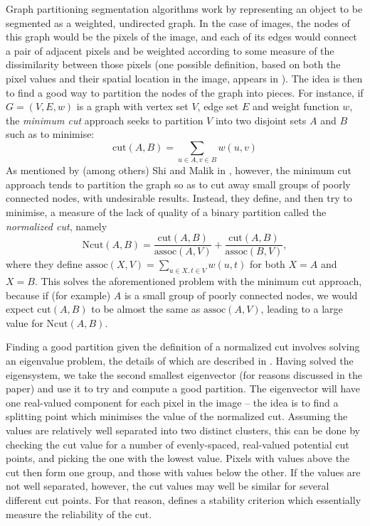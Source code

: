 Graph partitioning segmentation algorithms work by representing an object to be segmented as a weighted, undirected graph. In the case of images, the nodes of this graph would be the pixels of the image, and each of its edges would connect a pair of adjacent pixels and be weighted according to some measure of the dissimilarity between those pixels (one possible definition, based on both the pixel values and their spatial location in the image, appears in \cite{shi00}). The idea is then to find a good way to partition the nodes of the graph into pieces. For instance, if $G = (V,E,w)$ is a graph with vertex set $V$, edge set $E$ and weight function $w$, the \emph{minimum cut} approach seeks to partition $V$ into two disjoint sets $A$ and $B$ such as to minimise:
%
\[
\mbox{cut}(A,B) = \sum_{u \in A, v \in B} w(u,v)
\]
%
As mentioned by (among others) Shi and Malik in \cite{shi00}, however, the minimum cut approach tends to partition the graph so as to cut away small groups of poorly connected nodes, with undesirable results. Instead, they define, and then try to minimise, a measure of the lack of quality of a binary partition called the \emph{normalized cut}, namely
%
\[
\mbox{Ncut}(A,B) = \frac{\mbox{cut}(A,B)}{\mbox{assoc}(A,V)} + \frac{\mbox{cut}(A,B)}{\mbox{assoc}(B,V)},
\]
%
where they define $\mbox{assoc}(X,V) = \sum_{u \in X, t \in V} w(u,t)$ for both $X = A$ and $X = B$. This solves the aforementioned problem with the minimum cut approach, because if (for example) $A$ is a small group of poorly connected nodes, we would expect $\mbox{cut}(A,B)$ to be almost the same as $\mbox{assoc}(A,V)$, leading to a large value for $\mbox{Ncut}(A,B)$.

Finding a good partition given the definition of a normalized cut involves solving an eigenvalue problem, the details of which are described in \cite{shi00}. Having solved the eigensystem, we take the second smallest eigenvector (for reasons discussed in the paper) and use it to try and compute a good partition. The eigenvector will have one real-valued component for each pixel in the image -- the idea is to find a splitting point which minimises the value of the normalized cut. Assuming the values are relatively well separated into two distinct clusters, this can be done by checking the cut value for a number of evenly-spaced, real-valued potential cut points, and picking the one with the lowest value. Pixels with values above the cut then form one group, and those with values below the other. If the values are not well separated, however, the cut values may well be similar for several different cut points. For that reason, \cite{shi00} defines a stability criterion which essentially measure the reliability of the cut.

